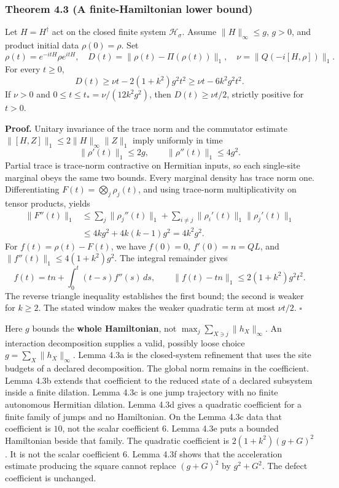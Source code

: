 \documentclass[
  11pt,
]{article}
\begin{document}
\subsubsection{Theorem 4.3 (A finite-Hamiltonian lower bound)}\label{theorem-4.3-a-finite-hamiltonian-lower-bound}

Let \(H=H^\dagger\) act on the closed finite system \(\mathcal H_\sigma\).
Assume \(\|H\|_\infty\le g\), \(g>0\), and product initial data \(\rho(0)=\rho\).
Set
\[
\rho(t)=e^{-itH}\rho e^{itH},\quad
D(t)=\|\rho(t)-\Pi(\rho(t))\|_1,\quad
\nu=\|Q(-i[H,\rho])\|_1.
\]
For every \(t\ge0\),
\[
D(t)\ge\nu t-2(1+k^2)g^2t^2
       \ge\nu t-6k^2g^2t^2.
\]
If \(\nu>0\) and \(0\le t\le t_*=\nu/(12k^2g^2)\), then
\(D(t)\ge\nu t/2\), strictly positive for \(t>0\).

\textbf{Proof.} Unitary invariance of the trace norm and the commutator estimate
\(\|[H,Z]\|_1\le2\|H\|_\infty\|Z\|_1\) imply uniformly in time
\[
\|\rho'(t)\|_1\le2g,\qquad
\|\rho''(t)\|_1\le4g^2.
\]
Partial trace is trace-norm contractive on Hermitian inputs, so each
single-site marginal obeys the same two bounds. Every marginal density has
trace norm one. Differentiating
\(F(t)=\bigotimes_j\rho_j(t)\), and using trace-norm multiplicativity on
tensor products, yields
\[
\begin{aligned}
\|F''(t)\|_1
&\le \sum_j\|\rho_j''(t)\|_1
 +\sum_{i\ne j}\|\rho_i'(t)\|_1\|\rho_j'(t)\|_1\\
&\le4kg^2+4k(k-1)g^2=4k^2g^2.
\end{aligned}
\]
For \(f(t)=\rho(t)-F(t)\), we have \(f(0)=0\), \(f'(0)=n=QL\), and
\(\|f''(t)\|_1\le4(1+k^2)g^2\). The integral remainder gives
\[
f(t)=tn+\int_0^t(t-s)f''(s)\,ds,\qquad
\|f(t)-tn\|_1\le2(1+k^2)g^2t^2.
\]
The reverse triangle inequality establishes the first bound; the second is
weaker for \(k\ge2\). The stated window makes the weaker quadratic term
at most \(\nu t/2\). \(\square\)

Here \(g\) bounds the \textbf{whole Hamiltonian}, not
\(\max_j\sum_{X\ni j}\|h_X\|_\infty\).
An interaction decomposition supplies a valid, possibly loose choice
\(g=\sum_X\|h_X\|_\infty\). Lemma 4.3a is the closed-system refinement
that uses the site budgets of a declared decomposition. The global norm
remains in the coefficient. Lemma 4.3b extends that coefficient to the
reduced state of a declared subsystem inside a finite dilation. Lemma 4.3c
is one jump trajectory with no finite autonomous Hermitian dilation. Lemma 4.3d
gives a quadratic coefficient for a finite family of jumps and no
Hamiltonian. On the Lemma 4.3c data that coefficient is \(10\), not the
scalar coefficient \(6\). Lemma 4.3e puts a bounded Hamiltonian beside
that family. The quadratic coefficient is \(2(1+k^2)(g+G)^2\). It is
not the scalar coefficient \(6\). Lemma 4.3f shows that the
acceleration estimate producing the square cannot replace
\((g+G)^2\) by \(g^2+G^2\). The defect coefficient is unchanged.
\end{document}
